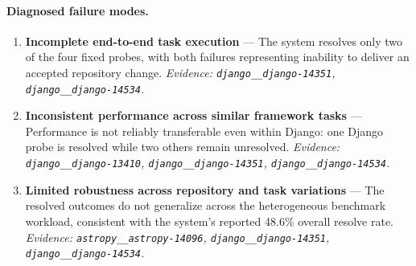 \paragraph{Diagnosed failure modes.}\begin{enumerate}\itemsep1pt
\item \textbf{Incomplete end-to-end task execution} --- The system resolves only two of the four fixed probes, with both failures representing inability to deliver an accepted repository change. \emph{Evidence: \texttt{django\_\_django-14351}, \texttt{django\_\_django-14534}.}
\item \textbf{Inconsistent performance across similar framework tasks} --- Performance is not reliably transferable even within Django: one Django probe is resolved while two others remain unresolved. \emph{Evidence: \texttt{django\_\_django-13410}, \texttt{django\_\_django-14351}, \texttt{django\_\_django-14534}.}
\item \textbf{Limited robustness across repository and task variations} --- The resolved outcomes do not generalize across the heterogeneous benchmark workload, consistent with the system's reported 48.6\% overall resolve rate. \emph{Evidence: \texttt{astropy\_\_astropy-14096}, \texttt{django\_\_django-14351}, \texttt{django\_\_django-14534}.}
\end{enumerate}
